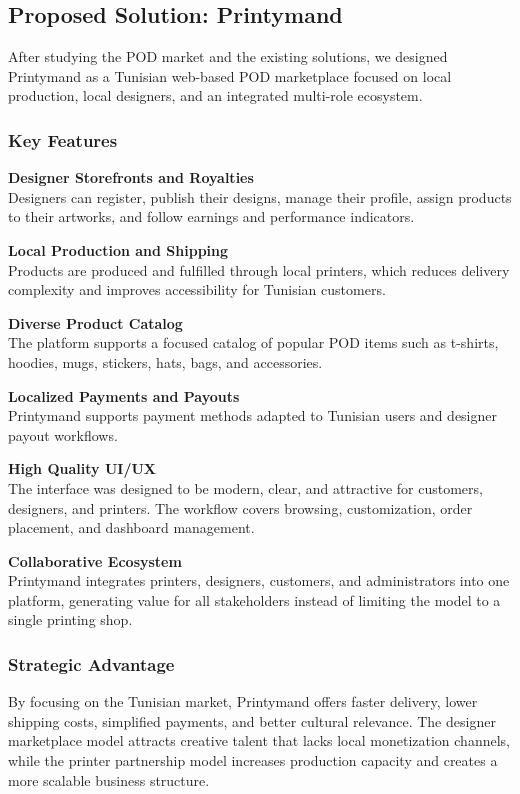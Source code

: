 \subsection{Proposed Solution: Printymand}
After studying the POD market and the existing solutions, we designed Printymand as a Tunisian web-based POD marketplace focused on local production, local designers, and an integrated multi-role ecosystem.

\subsubsection{Key Features}
\textbf{Designer Storefronts and Royalties}\\
Designers can register, publish their designs, manage their profile, assign products to their artworks, and follow earnings and performance indicators.

\textbf{Local Production and Shipping}\\
Products are produced and fulfilled through local printers, which reduces delivery complexity and improves accessibility for Tunisian customers.

\textbf{Diverse Product Catalog}\\
The platform supports a focused catalog of popular POD items such as t-shirts, hoodies, mugs, stickers, hats, bags, and accessories.

\textbf{Localized Payments and Payouts}\\
Printymand supports payment methods adapted to Tunisian users and designer payout workflows.

\textbf{High Quality UI/UX}\\
The interface was designed to be modern, clear, and attractive for customers, designers, and printers.
The workflow covers browsing, customization, order placement, and dashboard management.

\textbf{Collaborative Ecosystem}\\
Printymand integrates printers, designers, customers, and administrators into one platform, generating value for all stakeholders instead of limiting the model to a single printing shop.

\subsubsection{Strategic Advantage}
By focusing on the Tunisian market, Printymand offers faster delivery, lower shipping costs, simplified payments, and better cultural relevance.
The designer marketplace model attracts creative talent that lacks local monetization channels, while the printer partnership model increases production capacity and creates a more scalable business structure.

